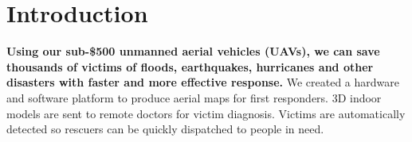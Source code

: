 
\section{Introduction}						%








\textbf{Using our sub-\$500 unmanned aerial vehicles (UAVs), we can save thousands of victims of floods, earthquakes, hurricanes and other disasters with faster and more effective response.} We created a hardware and software platform to produce aerial maps for first responders. 3D indoor models are sent to remote doctors for victim diagnosis. Victims are automatically detected so rescuers can be quickly dispatched to people in need.

